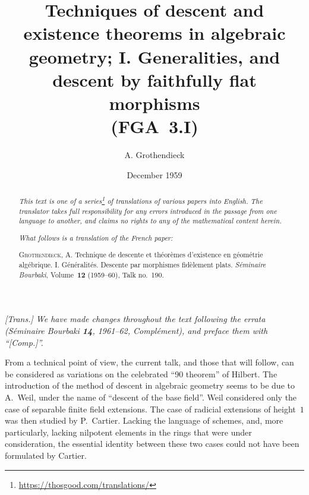 \documentclass{article}
\title{Techniques of descent and existence theorems in algebraic geometry; I. Generalities, and descent by faithfully flat morphisms\\(FGA~3.I)}
\author{A. Grothendieck}
\date{December 1959}
\theoremstyle{plain}
\theoremstyle{definition}
\begin{document}
\maketitle
\thispagestyle{fancy}

\renewcommand{\abstractname}{Translator's note.}

\begin{abstract}
  \renewcommand*{\thefootnote}{\fnsymbol{footnote}}
  \emph{This text is one of a series\footnote{\url{https://thosgood.com/translations/}} of translations of various papers into English.}
  \emph{The translator takes full responsibility for any errors introduced in the passage from one language to another, and claims no rights to any of the mathematical content herein.}

  \medskip
  
  \emph{What follows is a translation of the French paper:}

  \medskip\noindent
  \textsc{Grothendieck, A.}
  Technique de descente et th\'{e}or\`{e}mes d'existence en g\'{e}om\'{e}trie alg\'{e}brique. I. G\'{e}n\'{e}ralit\'{e}s. Descente par morphismes fid\`{e}lement plats.
  \emph{S\'{e}minaire Bourbaki}, Volume~\textbf{12} (1959--60), Talk no.~190.
\end{abstract}

\setcounter{footnote}{0}

\tableofcontents



\section*{}

\emph{[Trans.] We have made changes throughout the text following the errata (\emph{S\'{e}minaire Bourbaki} \textbf{14}, 1961--62, Compl\'{e}ment), and preface them with ``[Comp.]''.}

From a technical point of view, the current talk, and those that will follow, can be considered as variations on the celebrated ``90 theorem'' of Hilbert.
The introduction of the method of descent in algebraic geometry seems to be due to A.~Weil, under the name of ``descent of the base field''.
Weil considered only the case of separable finite field extensions.
The case of radicial extensions of height~$1$ was then studied by P.~Cartier.
Lacking the language of schemes, and, more particularly, lacking nilpotent elements in the rings that were under consideration, the essential identity between these two cases could not have been formulated by Cartier.
\end{document}
